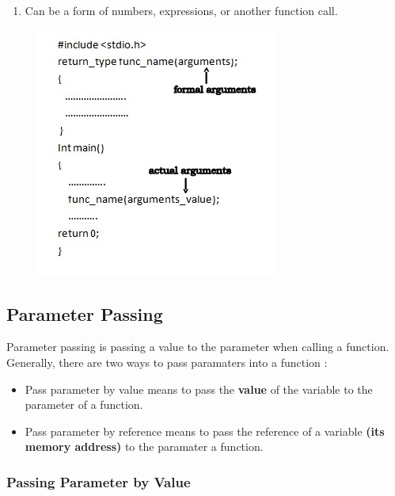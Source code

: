 \begin{enumerate}
\begin{enumerate}
    \item Can be a form of numbers, 
    expressions, or another function call.
\end{enumerate}
\begin{figure}[H]
	\centering
	\includegraphics[width=0.5\linewidth]{../P3/img/screenshot006.png}
	\caption{}
	\label{fig:parameterformalaktual}
\end{figure}
\end{enumerate}
\subsection{Parameter Passing} 
Parameter passing is passing a value to the parameter when calling a function.
Generally, there are two ways to pass paramaters into a function :
\begin{itemize}
	\item Pass parameter by value means to pass the 
    \textbf{value} of the variable to the parameter of a function.
	
    \item Pass parameter by reference means to pass the 
    reference of a variable \textbf{(its memory address)} to 
    the paramater a function.
\end{itemize}

\subsubsection{Passing Parameter by Value}


